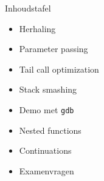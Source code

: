 \documentclass{beamer}
\begin{document}
{
\begin{frame}{Inhoudstafel}
\begin{itemize}
    \item Herhaling
    \item Parameter passing
    \item Tail call optimization
    \item Stack smashing
    \item Demo met \texttt{gdb}
    \item Nested functions
    \item Continuations
    \item Examenvragen
\end{itemize}
\end{frame}
}
\end{document}
